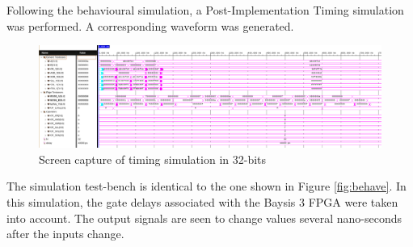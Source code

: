 \documentclass[CMPE]{../KGCOEReport}
\begin{document}
    \pagebreak

    Following the behavioural simulation, a Post-Implementation Timing simulation was performed.
    A corresponding waveform was generated.

    \begin{figure}[h!]
        \centering
        \includegraphics[width=\textwidth]{img/timing_32}
        \caption{Screen capture of timing simulation in 32-bits}
        \label{fig:timing}
    \end{figure}

    The simulation test-bench is identical to the one shown in Figure \ref{fig:behave}.
    In this simulation, the gate delays associated with the Baysis 3 FPGA were taken into account.
    The output signals are seen to change values several nano-seconds after the inputs change.
\end{document}

